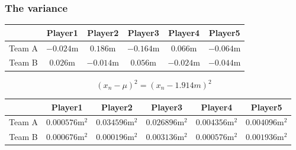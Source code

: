 \documentclass{beamer}
\begin{document}
\begin{frame}
    \frametitle{The variance}

    \footnotesize
    \begin{tabular}{ c|ccccc }
        \hline
             & Player1 & Player2 & Player3 & Player4 & Player5 \\ 
        \hline
            Team A & \(-0.024\)m & \(0.186\)m & \(-0.164\)m & \(0.066\)m & \(-0.064\)m \\ 
            Team B & \(0.026\)m & \(-0.014\)m & \(0.056\)m & \(-0.024\)m & \(-0.044\)m \\ 
        \hline
    \end{tabular}

    \vspace{0.5cm}

    \normalsize
    \begin{equation*}
        \left( x_{n}-  \mu  \right) ^{2} =  \left( x_{n}- 1.914m \right) ^{2}
    \end{equation*}

    \vspace{0.5cm}

    \tiny
    \begin{tabular}{ c|ccccc }
        \hline
             & Player1 & Player2 & Player3 & Player4 & Player5 \\ 
        \hline
            Team A & \(0.000576\)m\(^{2}\) & \(0.034596\)m\(^{2}\) & \(0.026896\)m\(^{2}\) & \(0.004356\)m\(^{2}\) & \(0.004096\)m\(^{2}\) \\ 
            Team B & \(0.000676\)m\(^{2}\) & \(0.000196\)m\(^{2}\) & \(0.003136\)m\(^{2}\) & \(0.000576\)m\(^{2}\) & \(0.001936\)m\(^{2}\) \\ 
        \hline
    \end{tabular}

\end{frame}
\end{document}
